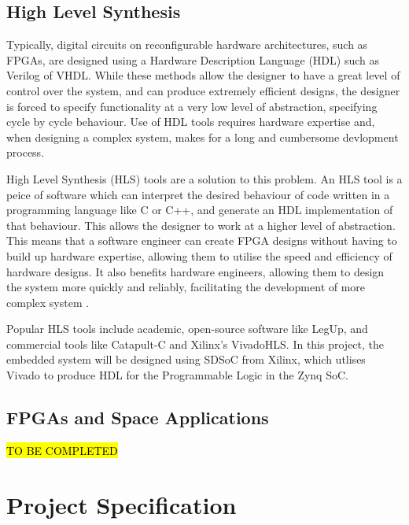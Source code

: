 \documentclass[12pt]{article}
\begin{document}
\subsection{High Level Synthesis}
\label{sec:Background-HLS}
\vspace{-12pt}

Typically, digital circuits on reconfigurable hardware architectures, such as FPGAs, are designed using a Hardware Description Language (HDL) such as Verilog of VHDL. While these methods allow the designer to have a great level of control over the system, and can produce extremely efficient designs, the designer is forced to specify functionality at a very low level of abstraction, specifying cycle by cycle behaviour. Use of HDL tools requires hardware expertise and, when designing a complex system, makes for a long and cumbersome devlopment process.

High Level Synthesis (HLS) tools are a  solution to this problem. An HLS tool is a peice of software which can interpret the desired behaviour of code written in a programming language like C or C++, and generate an HDL implementation of that behaviour. This allows the designer to work at a higher level of abstraction.  This means that a software engineer can create FPGA designs without having to build up hardware expertise, allowing them to utilise the speed and efficiency of hardware designs. It also benefits hardware engineers, allowing them to design the system more quickly and reliably, facilitating the development of more complex system \cite{HLS}.

Popular HLS tools include academic, open-source software like LegUp, and commercial tools like Catapult-C and Xilinx's VivadoHLS. In this project, the embedded system will be designed using SDSoC from Xilinx, which utlises Vivado to produce HDL for the Programmable Logic in the Zynq SoC.

\subsection{FPGAs and Space Applications}
\label{sec:Background-FPGAsAndSpaceApplications}
\vspace{-12pt}

\hl{TO BE COMPLETED}

\section{Project Specification}
\label{sec:ProjSpec}
\vspace{-12pt}
\end{document}
